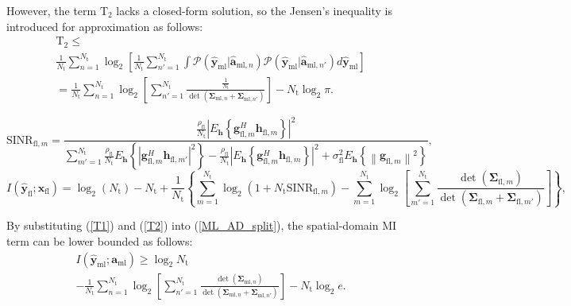 \documentclass[journal]{IEEEtran}
\begin{document}
\begin{IEEEproof}
However, the term $\text{T}_2$ lacks a closed-form solution, so the Jensen's inequality is introduced for approximation as follows:
\begin{equation}
\begin{split}
&\text{T}_2 \leq \\
&\frac{1}{N_\text{t}} \sum_{n=1}^{N_\text{t}} \log_2 \left[\frac{1}{N_\text{t}} \sum_{n'=1}^{N_\text{t}} \int \mathcal{P} (\hat{\mathbf{y}}_{\text{ml}}|\hat{\mathbf{a}}_{\text{ml},n}) \mathcal{P} (\hat{\mathbf{y}}_{\text{ml}}|\hat{\mathbf{a}}_{\text{ml},n'}) d\hat{\mathbf{y}}_{\text{ml}} \right] \\
& = \frac{1}{N_\text{t}} \sum_{n=1}^{N_\text{t}} \log_2\left[  \sum_{n'=1}^{N_\text{t}} \frac{\frac{1}{N_\text{t}}} {\det(\mathbf{\Sigma}_{\text{ml},n} + \mathbf{\Sigma}_{\text{ml},n'})} \right] - N_\text{t}\log_2\pi.
\end{split}
\label{T2}
\end{equation}

\begin{figure*}[t]
\small
\begin{equation}
\text{SINR}_{\text{fl},m} = \frac{\frac{\rho_\text{fl}}{N_\text{t}} \left| E_{\mathbf{h}}\left\{ \mathbf{g}_{\text{fl},m}^H \mathbf{h}_{\text{fl},m} \right\} \right|^2} {\sum_{m'=1}^{N_\text{t}} \frac{\rho_\text{fl}}{N_\text{t}} E_{\mathbf{h}}\left\{ \left| \mathbf{g}_{\text{fl},m}^H \mathbf{h}_{\text{fl},m'}\right|^2 \right\} - \frac{\rho_\text{fl}}{N_\text{t}} \left| E_{\mathbf{h}}\left\{ \mathbf{g}_{\text{fl},m}^H \mathbf{h}_{\text{fl},m} \right\} \right|^2 + \sigma_\text{fl}^{2}E_{\mathbf{h}}\left\{ \left\| \mathbf{g}_{\text{fl},m} \right\|^2 \right\}},
\label{SINR_FL}
\end{equation}
\begin{equation}
I\left(\hat{\mathbf{y}}_{\text{fl}};\mathbf{x}_{\text{fl}}\right) = \log_2\left(N_\text{t}\right) - N_\text{t} + \frac{1}{N_\text{t}} \left\{ \sum_{m=1}^{N_\text{t}} \log_2\left(1+N_\text{t}\text{SINR}_{\text{fl},m}\right) - \sum_{m = 1}^{N_\text{t}} \log_2\left[\sum_{m'=1}^{N_\text{t}} \frac{\det\left(\mathbf{\Sigma}_{\text{fl},m}\right)} {\det\left(\mathbf{\Sigma}_{\text{fl},m} + \mathbf{\Sigma}_{\text{fl},m'}\right)}\right] \right\},
\label{SE_FL}
\end{equation}
\hrulefill
\end{figure*}

By substituting (\ref{T1}) and (\ref{T2}) into (\ref{ML_AD_split}), the spatial-domain MI term can be lower bounded as follows:
\begin{equation}
\begin{split}
&I(\hat{\mathbf{y}}_{\text{ml}};\mathbf{a}_\text{ml}) \geq \log_2 N_\text{t} \\
&- \frac{1}{N_\text{t}} \sum_{n = 1}^{N_\text{t}} \log_2\left[\sum_{n'=1}^{N_\text{t}} \frac{\det(\mathbf{\Sigma}_{\text{ml},n})} {\det(\mathbf{\Sigma}_{\text{ml},n} + \mathbf{\Sigma}_{\text{ml},n'})}\right] - N_\text{t}\log_2 e.
\end{split}
\label{SD_AP}
\end{equation}


\end{IEEEproof}
\end{document}
